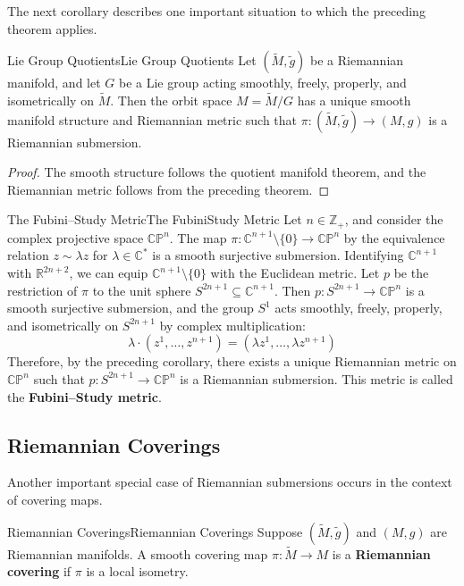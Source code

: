 \documentclass[../main.tex]{subfiles}
\begin{document}
The next corollary describes one important situation to which the preceding theorem applies.

\begin{corollary}{Lie Group Quotients}{Lie Group Quotients}
	Let $(\tilde{M}, \tilde{g})$ be a Riemannian manifold, and let $G$ be a Lie group acting smoothly, freely, properly, and isometrically on $\tilde{M}$. Then the orbit space $M = \tilde{M}/G$ has a unique smooth manifold structure and Riemannian metric such that $\pi: (\tilde{M}, \tilde{g}) \to (M, g)$ is a Riemannian submersion.
\end{corollary}
\begin{proof}
	The smooth structure follows the quotient manifold theorem, and the Riemannian metric follows from the preceding theorem.
\end{proof}

\begin{example}{The Fubini–Study Metric}{The FubiniStudy Metric}
	Let $n \in \mathbb{Z}_+$, and consider the complex projective space $\mathbb{CP}^n$. The map $\pi: \mathbb{C}^{n+1} \setminus \{0\} \to \mathbb{CP}^n$ by the equivalence relation $z \sim \lambda z$ for $\lambda \in \mathbb{C}^*$ is a smooth surjective submersion. Identifying $\mathbb{C}^{n+1}$ with $\mathbb{R}^{2n+2}$, we can equip $\mathbb{C}^{n+1} \setminus \{0\}$ with the Euclidean metric. Let $p$ be the restriction of $\pi$ to the unit sphere $S^{2n+1} \subseteq \mathbb{C}^{n+1}$. Then $p: S^{2n+1} \to \mathbb{CP}^n$ is a smooth surjective submersion, and the group $S^1$ acts smoothly, freely, properly, and isometrically on $S^{2n+1}$ by complex multiplication:
	\begin{equation*}
		\lambda \cdot (z^1, \ldots, z^{n+1}) = (\lambda z^1, \ldots, \lambda z^{n+1})
	\end{equation*}
	Therefore, by the preceding corollary, there exists a unique Riemannian metric on $\mathbb{CP}^n$ such that $p: S^{2n+1} \to \mathbb{CP}^n$ is a Riemannian submersion. This metric is called the \textbf{Fubini–Study metric}.
\end{example}

\subsection{Riemannian Coverings}
Another important special case of Riemannian submersions occurs in the context of covering maps.
\begin{definition}{Riemannian Coverings}{Riemannian Coverings}
	Suppose $(\tilde{M}, \tilde{g})$ and $(M, g)$ are Riemannian manifolds. A smooth covering map $\pi: \tilde{M} \to M$ is a \textbf{Riemannian covering} if $\pi$ is a local isometry.
\end{definition}
\end{document}
